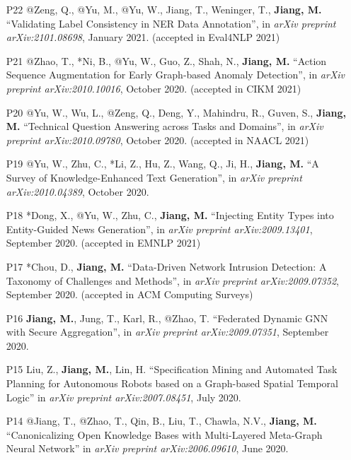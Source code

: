 \documentclass[10pt]{article}
\newenvironment{myindentpar}[1]%
{\begin{list}{}%
         {\setlength{\leftmargin}{#1}}%
         \item[]%
}
{\end{list}}
\newcounter{list}
\begin{document}
\begin{myindentpar}{0.00cm}
\begin{enumerate}[leftmargin=.5cm]
\item[P22] @Zeng, Q., @Yu, M., @Yu, W., Jiang, T., Weninger, T., \textbf{Jiang, M.} ``Validating Label Consistency in NER Data Annotation'', in \textit{arXiv preprint arXiv:2101.08698}, January 2021. (accepted in Eval4NLP 2021)

\item[P21] @Zhao, T., *Ni, B., @Yu, W., Guo, Z., Shah, N., \textbf{Jiang, M.} ``Action Sequence Augmentation for Early Graph-based Anomaly Detection'', in \textit{arXiv preprint arXiv:2010.10016}, October 2020. (accepted in CIKM 2021)

\item[P20] @Yu, W., Wu, L., @Zeng, Q., Deng, Y., Mahindru, R., Guven, S., \textbf{Jiang, M.} ``Technical Question Answering across Tasks and Domains'', in \textit{arXiv preprint arXiv:2010.09780}, October 2020. (accepted in NAACL 2021)

\item[P19] @Yu, W., Zhu, C., *Li, Z., Hu, Z., Wang, Q., Ji, H., \textbf{Jiang, M.} ``A Survey of Knowledge-Enhanced Text Generation'', in \textit{arXiv preprint arXiv:2010.04389}, October 2020.
		
\item[P18] *Dong, X., @Yu, W., Zhu, C., \textbf{Jiang, M.} ``Injecting Entity Types into Entity-Guided News Generation'', in \textit{arXiv preprint arXiv:2009.13401}, September 2020. (accepted in EMNLP 2021)
		
\item[P17] *Chou, D., \textbf{Jiang, M.} ``Data-Driven Network Intrusion Detection: A Taxonomy of Challenges and Methods'', in \textit{arXiv preprint arXiv:2009.07352}, September 2020. (accepted in ACM Computing Surveys)

\item[P16] \textbf{Jiang, M.}, Jung, T., Karl, R., @Zhao, T. ``Federated Dynamic GNN with Secure Aggregation'', in \textit{arXiv preprint arXiv:2009.07351}, September 2020.

\item[P15] Liu, Z., \textbf{Jiang, M.}, Lin, H. ``Specification Mining and Automated Task Planning for Autonomous Robots based on a Graph-based Spatial Temporal Logic'' in \textit{arXiv preprint arXiv:2007.08451}, July 2020.

\item[P14] @Jiang, T., @Zhao, T., Qin, B., Liu, T., Chawla, N.V., \textbf{Jiang, M.} ``Canonicalizing Open Knowledge Bases with Multi-Layered Meta-Graph Neural Network'' in \textit{arXiv preprint arXiv:2006.09610}, June 2020.
		

\end{enumerate}
\end{myindentpar}
\end{document}
